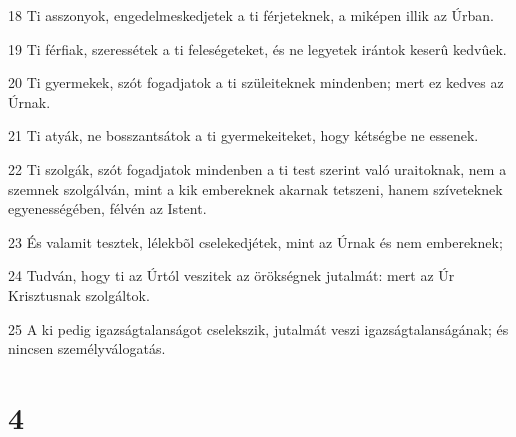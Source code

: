 \par 18 Ti asszonyok, engedelmeskedjetek a ti férjeteknek, a miképen illik az Úrban.
\par 19 Ti férfiak, szeressétek a ti feleségeteket, és ne legyetek irántok keserû kedvûek.
\par 20 Ti gyermekek, szót fogadjatok a ti szüleiteknek mindenben; mert ez kedves az Úrnak.
\par 21 Ti atyák, ne bosszantsátok a ti gyermekeiteket, hogy kétségbe ne essenek.
\par 22 Ti szolgák, szót fogadjatok mindenben a ti test szerint való uraitoknak, nem a szemnek szolgálván, mint a kik embereknek akarnak tetszeni, hanem szíveteknek egyenességében, félvén az Istent.
\par 23 És valamit tesztek, lélekbõl cselekedjétek, mint az Úrnak és nem embereknek;
\par 24 Tudván, hogy ti az Úrtól veszitek az örökségnek jutalmát: mert az Úr Krisztusnak szolgáltok.
\par 25 A ki pedig igazságtalanságot cselekszik, jutalmát veszi igazságtalanságának; és nincsen személyválogatás.

\chapter{4}

